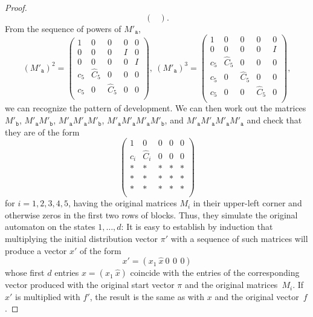 \documentclass[a4paper,cleveref, autoref, thm-restate]{lipics-v2021}
\begin{document}
\begin{proof}
\begin{displaymath}
\begin{pmatrix}
\end{pmatrix}
.
\end{displaymath}
From the sequence of powers of $M'_{\mathtt{a}}$,
\begin{displaymath}
  (M'_{\mathtt{a}})^2
=
  \begin{pmatrix}
1&  0&0&0&0\\
  0 & 0 & 0 & I &0\\
0&  0 & 0 & 0 & I \\
c_5&  \hat C_5  &  0 & 0 &0\\
c_5& 0&  \hat C_5  & 0 & 0\\
\end{pmatrix},
\  (M'_{\mathtt{a}})^3
=
  \begin{pmatrix}
1&  0&0&0&0\\
0&  0 & 0 & 0 & I \\
c_5&  \hat C_5  &  0 & 0 &0\\
c_5& 0&  \hat C_5  & 0 & 0\\
c_5& 0& 0& \hat C_5  & 0\\
\end{pmatrix},
\end{displaymath}
we can recognize the pattern of development. 
We can then work out the matrices
$M'_{\mathtt{b}}$,
$M'_{\mathtt{a}}
M'_{\mathtt{b}}$,
$M'_{\mathtt{a}}
M'_{\mathtt{a}}
M'_{\mathtt{b}}$,
$M'_{\mathtt{a}}
M'_{\mathtt{a}}
M'_{\mathtt{a}}
M'_{\mathtt{b}}$, and
$M'_{\mathtt{a}}
M'_{\mathtt{a}}
M'_{\mathtt{a}}
M'_{\mathtt{a}}$
and check that they
are of the form
\begin{displaymath}
  \begin{pmatrix}
1&    0 & 0 & 0 &0    \\
 c_i&    \hat C_i & 0 & 0 &0\\
    *&* & * & * & *\\
    *&* & * & * & *\\
    *&* & * & * & *\\
  \end{pmatrix}
\end{displaymath}
for $i=1,2,3,4,5$,
having the original matrices $M_i$ in their upper-left corner
and otherwise zeros in the first two rows of blocks.
 Thus, they simulate the original automaton on the states
$1,\ldots,d$:
It is easy to establish by induction that
multiplying the initial distribution vector ${\pi'}$ with a sequence of such matrices will produce a
vector $x'$ of the form
\begin{equation}
  \label{eq:result-form}
x' = (x_1\ \hat x \ 0\,\ 0\,\ 0)
\end{equation}
whose first $d$ entries
$x=(x_1\ \hat x)$ %
coincide with the entries of
the corresponding vector produced with the original start vector
$\pi$ and
the original
matrices~$M_i$.
If $x'$ is multiplied with $f'$, the result is the same as with
$x$ and the original vector~$f$.


\end{proof}
\end{document}
